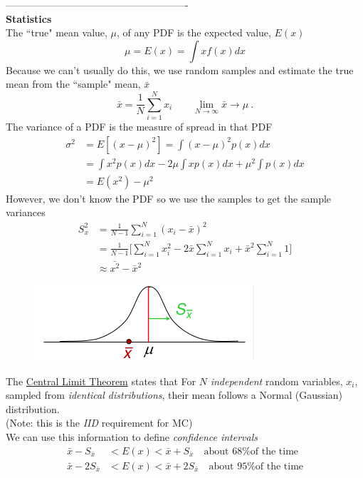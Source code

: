 \documentclass[12pt]{article}
\begin{document}
\clearpage
-------------------------------------------------------\\
\textbf{Statistics}\\
The ``true" mean value, $\mu$, of any PDF is the expected value, $E(x)$
\[
\mu = E(x) = \int x f(x) dx
\]
Because we can't usually do this, we use random samples and estimate the true mean from the ``sample" mean, $\bar{x}$
\[
\bar{x} = \frac{1}{N}\sum_{i=1}^N x_i \qquad \lim_{N \to \infty} \bar{x} \rightarrow \mu\:.
\]
The variance of a PDF is the measure of spread in that PDF
\begin{align*}
\sigma^2 &= E[(x - \mu)^2] = \int (x - \mu)^2 p(x) dx \\
&= \int x^2 p(x) dx - 2 \mu \int x p(x) dx + \mu^2 \int p(x) dx\\
&= E(x^2) - \mu^2
\end{align*}
%
However, we don't know the PDF so we use the samples to get the sample variances
\begin{align*}
S_x^2 &= \frac{1}{N-1}\sum_{i=1}^N (x_i - \bar{x})^2 \\
&= \frac{1}{N-1} \biggl[\sum_{i=1}^N x_i^2 - 2 \bar{x}\sum_{i=1}^N x_i + \bar{x}^2 \sum_{i=1}^N 1 \biggr] \\
&\approx \bar{x^2} - \bar{x}^2
\end{align*}

\begin{figure}[h!]
\begin{center}
  \includegraphics[height=1 in,clip]{../figs/gaussian}
\end{center}
  \label{fig:gaussian}
\end{figure}
%
The \underline{Central Limit Theorem} states that
For $N$ \textit{independent} random variables, $x_i$, sampled from \textit{identical distributions}, their mean follows a Normal (Gaussian) distribution.\\
(Note: this is the \textit{IID} requirement for MC)\\
We can use this information to define \textit{confidence intervals}
\begin{align*}
\bar{x} - S_{\bar{x}} &< E(x) < \bar{x} + S_{\bar{x}} \quad \text{about 68\% of the time}\\
\bar{x} - 2S_{\bar{x}} &< E(x) < \bar{x} + 2S_{\bar{x}} \quad \text{about 95\% of the time}
\end{align*}
\end{document}
